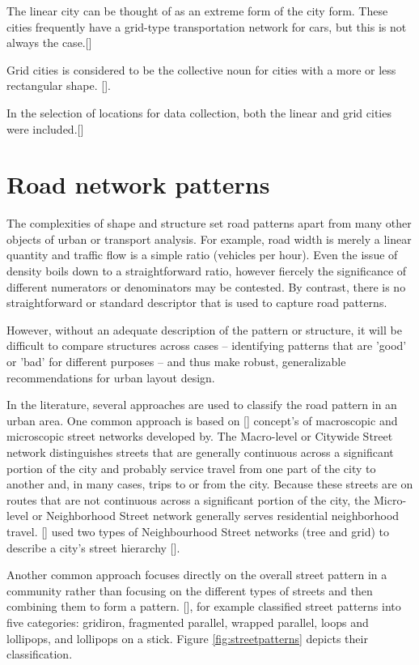 The linear city can be thought of as an extreme form of the city form. These cities frequently have a grid-type transportation network for cars, but this is not always the case.[\cite{Snellen:2002}] 

Grid cities is considered to be the collective noun for cities with a more or less rectangular shape. [\cite{Snellen:2002}].

In the selection of locations for data collection, both the linear and grid cities were included.[\cite{Snellen:2002}]

\section{Road network patterns}
The complexities of shape and structure set road patterns apart from many other objects of urban or transport analysis. For example, road width is merely a linear quantity and traffic flow is a simple ratio (vehicles per hour). Even the issue of density boils down to a straightforward ratio, however fiercely the significance of different numerators or denominators may be contested. By contrast, there is no straightforward or standard descriptor that is used to capture road patterns. 

However, without an adequate description of the pattern or structure, it will be difficult to compare structures across cases – identifying patterns that are 'good' or 'bad' for different purposes – and thus make robust, generalizable recommendations for urban layout design.

In the literature, several approaches are used to classify the road pattern in an urban area. One common approach is based on [\cite{Marshall:2005}] concept's of macroscopic and microscopic street networks developed by. The Macro-level or Citywide Street network distinguishes streets that are generally continuous across a significant portion of the city and probably service travel from one part of the city to another and, in many cases, trips to or from the city. Because these streets are on routes that are not continuous across a significant portion of the city, the Micro-level or Neighborhood Street network generally serves residential neighborhood travel. [\cite{Marshall:2005}] used two types of Neighbourhood Street networks (tree and grid) to describe a city's street hierarchy [\cite{Marshall:2010, Marshall:2011}]. 

Another common approach focuses directly on the overall street pattern in a community rather than focusing on the different types of streets and then combining them to form a pattern. [\cite{Southworth:2003}], for example classified street patterns into five categories: gridiron, fragmented parallel, wrapped parallel, loops and lollipops, and lollipops on a stick. Figure \ref{fig:streetpatterns} depicts their classification.

